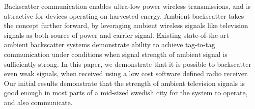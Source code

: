 Backscatter communication enables ultra-low
power wireless transmissions, and is attractive
for devices operating on harvested energy. Ambient backscatter
takes the concept further forward, by leveraging
ambient wireless signals like
television signals as both source of power
and carrier signal. Existing state-of-the-art
ambient backscatter systems demonstrate ability to 
achieve tag-to-tag communication under conditions when
signal strength of ambient signal is sufficiently
strong.  In this paper, we demonstrate that it is possible
to backscatter even weak signals, when received using
a low cost software defined radio receiver. Our initial results 
demonstrate that the strength of ambient television signals is good
enough in most parts of a mid-sized swedish city for the system
to operate, and also communicate.
